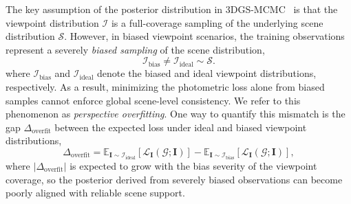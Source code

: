 \documentclass[lettersize,journal]{IEEEtran}
\begin{document}
The key assumption of the posterior distribution in 3DGS-MCMC~\cite{mcmc} is that the viewpoint distribution $\mathcal{I}$ is a full-coverage sampling of the underlying scene distribution $\mathcal{S}$. However, in biased viewpoint scenarios, the training observations represent a severely \emph{biased sampling} of the scene distribution,
\begin{equation}
    \mathcal{I}_{\text{bias}} \neq \mathcal{I}_{\text{ideal}} \sim \mathcal{S}.
    \label{eq5}
\end{equation}
where $\mathcal{I}_{\text{bias}}$ and $\mathcal{I}_{\text{ideal}}$ denote the biased and ideal viewpoint distributions, respectively.
As a result, minimizing the photometric loss alone from biased samples cannot enforce global scene-level consistency. We refer to this phenomenon as \emph{perspective overfitting}. One way to quantify this mismatch is the gap $\Delta_{\text{overfit}}$ between the expected loss under ideal and biased viewpoint distributions,
\begin{equation}
    \Delta_{\text{overfit}} = \mathbb{E}_{\mathbf{I} \sim \mathcal{I}_{\text{ideal}}} \left[ \mathcal{L}_{\mathbf{I}} (\mathcal{G}; \mathbf{I}) \right] - \mathbb{E}_{\mathbf{I} \sim \mathcal{I}_{\text{bias}}} \left[ \mathcal{L}_{\mathbf{I}} (\mathcal{G}; \mathbf{I}) \right],
    \label{eq5.1}
\end{equation}
where $\vert \Delta_{\text{overfit}} \vert$ is expected to grow with the bias severity of the viewpoint coverage, so the posterior derived from severely biased observations can become poorly aligned with reliable scene support.
\end{document}
